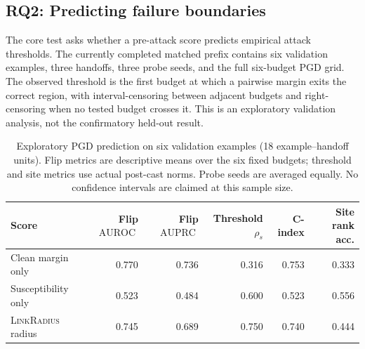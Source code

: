 \documentclass[11pt]{article}
\DeclareMathOperator{\AUPRC}{AUPRC}
\DeclareMathOperator{\AUROC}{AUROC}
\newcommand{\method}{\textsc{LinkRadius}}
\begin{document}
\subsection{RQ2: Predicting failure boundaries}

The core test asks whether a pre-attack score predicts empirical attack
thresholds. The currently completed matched prefix contains six validation
examples, three handoffs, three probe seeds, and the full six-budget PGD grid.
The observed threshold is the first budget at which a pairwise margin exits the
correct region, with interval-censoring between adjacent budgets and
right-censoring when no tested budget crosses it. This is an exploratory
validation analysis, not the confirmatory held-out result.

\begin{table}[t]
\centering
\small
\setlength{\tabcolsep}{3.2pt}
\caption{Exploratory PGD prediction on six validation examples (18
example--handoff units). Flip metrics are descriptive means over the six fixed
budgets; threshold and site metrics use actual post-cast norms. Probe seeds are
averaged equally. No confidence intervals are claimed at this sample size.}
\label{tab:core-prediction}
\begin{tabular}{lrrrrr}
\toprule
Score & Flip $\AUROC$ & Flip $\AUPRC$ & Threshold $\rho_s$ & C-index & Site rank acc. \\
\midrule
Clean margin only & 0.770 & 0.736 & 0.316 & 0.753 & 0.333 \\
Susceptibility only & 0.523 & 0.484 & 0.600 & 0.523 & 0.556 \\
\method{} radius & 0.745 & 0.689 & 0.750 & 0.740 & 0.444 \\
\bottomrule
\end{tabular}
\end{table}
\end{document}
